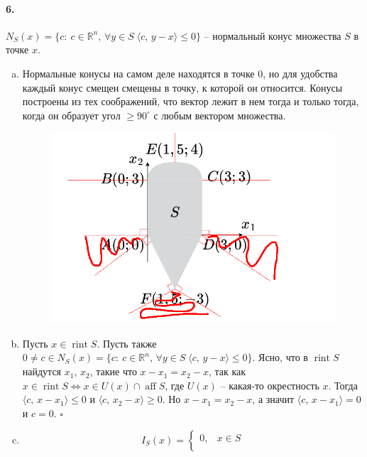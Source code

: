 \documentclass{article}
\DeclareMathOperator{\rint}{rint}
\DeclareMathOperator{\aff}{aff}
\newcommand*{\QED}{\null\nobreak\hfill\ensuremath{\square}}
\newcommand*{\R}{\mathbb{R}}
\begin{document}
\paragraph{6.} $N_S(x) = \{ c :\: c \in \R^n,\, \forall y \in S \; \langle c,\, y - x \rangle \leqslant 0 \}$ -- нормальный конус множества $S$ в точке $x$.
\begin{enumerate}[(a)]
    \item Нормальные конусы на самом деле находятся в точке 0, но для удобства каждый конус смещен смещены в точку, к которой он относится. Конусы построены из тех соображений, что вектор лежит в нем тогда и только тогда, когда он образует угол $\geqslant 90^\circ$ с любым вектором множества.
        \begin{figure}[H]
            \centering
            \includegraphics[scale=0.4]{nakovalnya_rusov.png}
        \end{figure}
    \item Пусть $x \in \rint S$. Пусть также $0 \neq c \in N_S(x) = \{ c :\: c \in \R^n,\, \forall y \in S \; \langle c,\, y - x \rangle \leqslant 0 \}$. Ясно, что в $\rint S$ найдутся $x_1,\, x_2$, такие что $x - x_1 = x_2 - x$, так как $x \in \rint S \iff x \in U(x) \cap \aff S$, где $U(x)$ -- какая-то окрестность $x$. Тогда $\langle c,\, x - x_1 \rangle \leqslant 0$ и $\langle c,\, x_2 - x \rangle \geqslant 0$. Но $x - x_1 = x_2 - x$, а значит $\langle c,\, x - x_1 \rangle = 0$ и $c = 0$. \QED
    \item  
        \[ I_S(x) = \begin{cases}
            0, & x \in S \\ 

\end{cases}\]
\end{enumerate}
\end{document}

